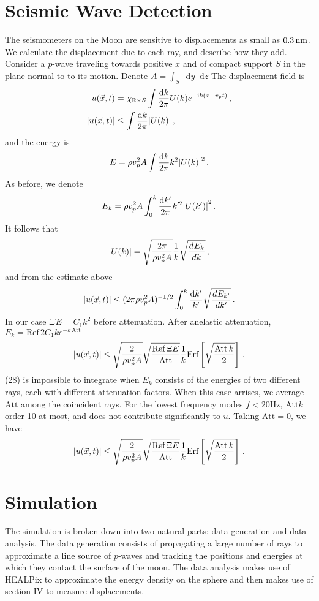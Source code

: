 \documentclass[prd,reprint,10pt,tightenlines]{revtex4-1}
\newcommand*\diff{\mathop{}\!\mathrm{d}}
\newcommand*\R{\mathbb R}
\newcommand*\te[1]{\text{#1}}
\newcommand*\ps[1]{\left[#1\right]}
\newcommand*\f[2]{\frac{#1}{#2}}
\newcommand*\I{\te{i}}
\newcommand*\td[3]{\frac{d^{#3}#1}{d #2^{#3}}}
\begin{document}
\section{Seismic Wave Detection}
The seismometers on the Moon are sensitive to displacements as small as $0.3\te{\,nm}$. We calculate the displacement due to each ray, and describe how they add. Consider a $p$-wave traveling towards positive $x$ and of compact support $S$ in the plane normal to to its motion. Denote $A =\int_S\diff y\diff z$ The displacement field is
\begin{align}
u(\vec x,t) &= \chi_{\R\times S}\int\f{\diff k}{2\pi}U(k)e^{-\I k(x-v_p t)}\,,\\
\abs{u(\vec x,t)}&\leq\int\f{\diff k}{2\pi}\abs{U(k)}\,,
\end{align}
and the energy is
\begin{align}
E = \rho v_p^2 A\int\f{\diff k}{2\pi}k^2\abs{U(k)}^2\,.
\end{align}
As before, we denote
\begin{align}
E_k = \rho v_p^2 A\int_0^k\f{\diff k'}{2\pi}k'^2\abs{U(k')}^2\,.
\end{align}
It follows that
\begin{align}
\abs{U(k)} = \sqrt{\f{2\pi}{\rho v_p^2 A}}\f1k\sqrt{\td{E_k}{k}{}}\,,
\end{align}
and from the estimate above
\begin{align}
\abs{u(\vec x,t)}\leq(2\pi\rho v_p^2 A)^{-1/2}\int_0^k\f{\diff k'}{k'}\sqrt{\td{E_{k'}}{k'}{}}\,.
\end{align}
In our case $\Xi E= C_1 k^2$ before attenuation. After anelastic attenuation, $E_k =\te{Ref}\,2C_1 k e^{-k\,\te{Att}}$
\begin{align}
\abs{u(\vec x,t)}\leq\sqrt{\f{2}{\rho v_p^2 A}}\sqrt{\f{\te{Ref}\,\Xi E}{\te{Att}}}\f1k\te{Erf}\ps{\sqrt{\f{\te{Att}\,k}{2}}}\,.
\end{align}
(28) is impossible to integrate when $E_k$ consists of the energies of two different rays, each with different attenuation factors. When this case arrises, we average $\te{Att}$ among the coincident rays. For the lowest frequency modes $f<20\te{Hz}$, $\te{Att} k$ order 10 at most, and does not contribute significantly to $u$. Taking $\te{Att} = 0$, we have
\begin{align}
\abs{u(\vec x,t)}\leq\sqrt{\f{2}{\rho v_p^2 A}}\sqrt{\f{\te{Ref}\,\Xi E}{\te{Att}}}\f1k\te{Erf}\ps{\sqrt{\f{\te{Att}\,k}{2}}}\,.
\end{align}
\section{Simulation}
The simulation is broken down into two natural parts: data generation and data analysis. The data generation consists of propagating a large number of rays to approximate a line source of $p$-waves and tracking the positions and energies at which they contact the surface of the moon. The data analysis makes use of HEALPix to approximate the energy density on the sphere and then makes use of section IV to measure displacements.
\end{document}
